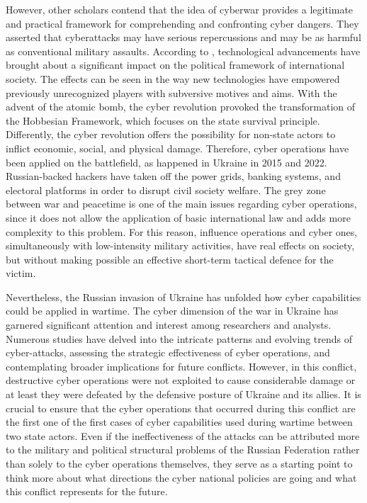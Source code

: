 However, other scholars contend that the idea of cyberwar provides a legitimate and practical framework for comprehending and confronting cyber dangers. They asserted that cyberattacks may have serious repercussions and may be as harmful as conventional military assaults. According to \textcite{kello_2013_the}, technological advancements have brought about a significant impact on the political framework of international society. The effects can be seen in the way new technologies have empowered previously unrecognized players with subversive motives and aims. With the advent of the atomic bomb, the cyber revolution provoked the transformation of the Hobbesian Framework, which focuses on the state survival principle. Differently, the cyber revolution offers the possibility for non-state actors to inflict economic, social, and physical damage. Therefore, cyber operations have been applied on the battlefield, as happened in Ukraine in 2015 and 2022. Russian-backed hackers have taken off the power grids, banking systems, and electoral platforms in order to disrupt civil society welfare. The grey zone between war and peacetime is one of the main issues regarding cyber operations, since it does not allow the application of basic international law and adds more complexity to this problem. For this reason, influence operations and cyber ones, simultaneously with low-intensity military activities, have real effects on society, but without making possible an effective short-term tactical defence for the victim. 

Nevertheless, the Russian invasion of Ukraine has unfolded how cyber capabilities could be applied in wartime. The cyber dimension of the war in Ukraine has garnered significant attention and interest among researchers and analysts. Numerous studies have delved into the intricate patterns and evolving trends of cyber-attacks, assessing the strategic effectiveness of cyber operations, and contemplating broader implications for future conflicts. However, in this conflict, destructive cyber operations were not exploited to cause considerable damage or at least they were defeated by the defensive posture of Ukraine and its allies. It is crucial to ensure that the cyber operations that occurred during this conflict are the first one of the first cases of cyber capabilities used during wartime between two state actors. Even if the ineffectiveness of the attacks can be attributed more to the military and political structural problems of the Russian Federation rather than solely to the cyber operations themselves, they serve as a starting point to think more about what directions the cyber national policies are going and what this conflict represents for the future.

